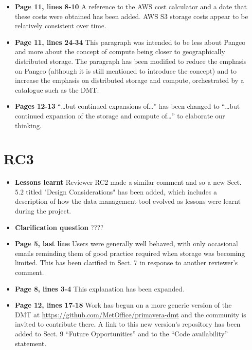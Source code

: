 \documentclass[12pt,a4paper]{article}
\begin{document}
\begin{itemize}
\item \textbf{Page 11, lines 8-10} A reference to the AWS cost calculator and a date that these costs were obtained has been added. AWS S3 storage costs appear to be relatively consistent over time.

\item \textbf{Page 11, lines 24-34} This paragraph was intended to be less about Pangeo and more about the concept of compute being closer to geographically distributed storage. The paragraph has been modified to reduce the emphasis on Pangeo (although it is still mentioned to introduce the concept) and to increase the emphasis on distributed storage and compute, orchestrated by a catalogue such as the DMT.

\item \textbf{Pages 12-13} ``\ldots but continued expansions of\ldots'' has been changed to ``\ldots but continued expansion of the storage and compute of\dots'' to elaborate our thinking.

\end{itemize}

\section{RC3}

\begin{itemize}
\item \textbf{Lessons learnt} Reviewer RC2 made a similar comment and so a new Sect. 5.2 titled "Design Considerations" has been added, which includes a description of how the data management tool evolved as lessons were learnt during the project.

\item \textbf{Clarification question} ????

\item \textbf{Page 5, last line} Users were generally well behaved, with only occasional emails reminding them of good practice required when storage was becoming limited. This has been clarified in Sect. 7 in response to another reviewer's comment.

\item \textbf{Page 8, lines 3-4} This explanation has been expanded.

\item \textbf{Page 12, lines 17-18} Work has begun on a more generic version of the DMT at \url{https://github.com/MetOffice/primavera-dmt} and the community is invited to contribute there. A link to this new version's repository has been added to Sect. 9 ``Future Opportunities'' and to the ``Code availability'' statement.

\end{itemize}
\end{document}
